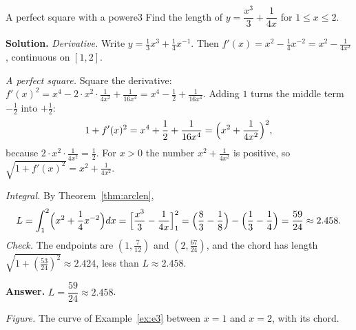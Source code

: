 \documentclass[11pt]{article}
\begin{document}
\begin{exmp}{A perfect square with a power}{e3}
Find the length of $y=\dfrac{x^3}3+\dfrac1{4x}$ for $1\le x\le2$.

\textbf{Solution.} \emph{Derivative.} Write $y=\frac13x^3+\frac14x^{-1}$. Then $f'(x)=x^2-\frac14x^{-2}=x^2-\frac1{4x^2}$, continuous on $[1,2]$.

\emph{A perfect square.} Square the derivative: $f'(x)^2=x^4-2\cdot x^2\cdot\frac1{4x^2}+\frac1{16x^4}=x^4-\frac12+\frac1{16x^4}$. Adding $1$ turns the middle term $-\frac12$ into $+\frac12$:
\[
1+f'(x)^2=x^4+\frac12+\frac1{16x^4}=\Bigl(x^2+\frac1{4x^2}\Bigr)^2 ,
\]
because $2\cdot x^2\cdot\frac1{4x^2}=\frac12$. For $x>0$ the number $x^2+\frac1{4x^2}$ is positive, so $\sqrt{1+f'(x)^2}=x^2+\frac1{4x^2}$.

\emph{Integral.} By Theorem~\ref{thm:arclen},
\[
L=\int_1^2\Bigl(x^2+\frac14x^{-2}\Bigr)dx=\Bigl[\frac{x^3}3-\frac1{4x}\Bigr]_1^2=\Bigl(\frac83-\frac18\Bigr)-\Bigl(\frac13-\frac14\Bigr)=\frac{59}{24}\approx2.458 .
\]
\emph{Check.} The endpoints are $(1,\frac7{12})$ and $(2,\frac{67}{24})$, and the chord has length $\sqrt{1+(\frac{53}{24})^2}\approx2.424$, less than $L\approx2.458$.

\textbf{Answer.} $L=\dfrac{59}{24}\approx2.458$.
\begin{center}
\par\small\emph{Figure.} The curve of Example~\ref{ex:e3} between $x=1$ and $x=2$, with its chord.
\end{center}
\end{exmp}
\end{document}
